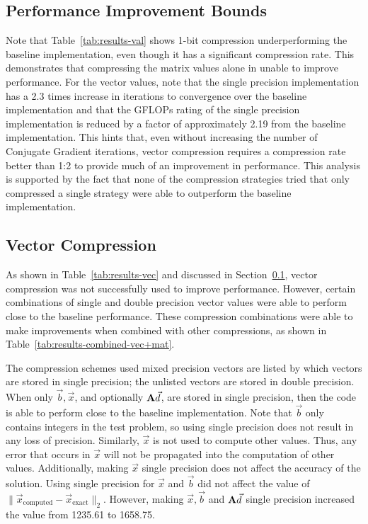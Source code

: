 

\subsection{Performance Improvement Bounds}
\label{sec:results-bounds}
Note that Table~\ref{tab:results-val} shows 1-bit compression underperforming the baseline implementation, even though it has a significant compression rate.
This demonstrates that compressing the matrix values alone in unable to improve performance.
For the vector values, note that the single precision implementation has a 2.3 times increase in iterations to convergence over the baseline implementation and that the GFLOPs rating of the single precision implementation is reduced by a factor of approximately 2.19 from the baseline implementation.
This hints that, even without increasing the number of Conjugate Gradient iterations, vector compression requires a compression rate better than 1:2 to provide much of an improvement in performance.
This analysis is supported by the fact that none of the compression strategies tried that only compressed a single strategy were able to outperform the baseline implementation.

\subsection{Vector Compression}
\label{sec:results-vec}
As shown in Table~\ref{tab:results-vec} and discussed in Section~\ref{sec:results-bounds}, vector compression was not successfully used to improve performance.
However, certain combinations of single and double precision vector values were able to perform close to the baseline performance.
These compression combinations were able to make improvements when combined with other compressions, as shown in Table~\ref{tab:results-combined-vec+mat}.

The compression schemes used mixed precision vectors are listed by which vectors are stored in single precision; the unlisted vectors are stored in double precision.
When only \(\vec{b}, \vec{x}\), and optionally \(\mathbf{A}\vec{d}\), are stored in single precision, then the code is able to perform close to the baseline implementation.
Note that \(\vec{b}\) only contains integers in the test problem, so using single precision does not result in any loss of precision.
Similarly, \(\vec{x}\) is not used to compute other values.
Thus, any error that occurs in \(\vec{x}\) will not be propagated into the computation of other values.
Additionally, making \(\vec{x}\) single precision does not affect the accuracy of the solution.
Using single precision for \(\vec{x}\) and \(\vec{b}\) did not affect the value of \(\|\vec{x}_\text{computed} - \vec{x}_\text{exact}\|_2\).
However, making \(\vec{x}, \vec{b}\) and \(\mathbf{A}\vec{d}\) single precision increased the value from 1235.61 to 1658.75.

